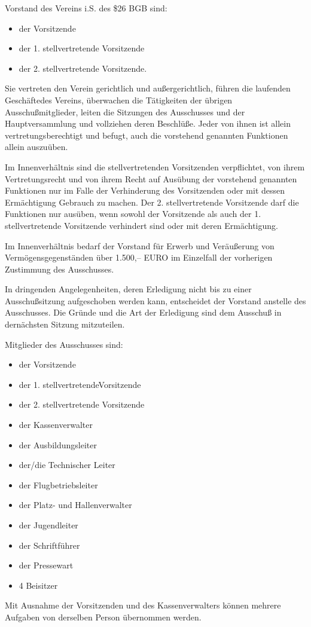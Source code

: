 \documentclass[11pt,a4paper,parskip=half]{scrartcl}
\begin{document}
\begin{contract}
\begin{multicols}{2}
    Vorstand des Vereins i.S. des \$26 BGB sind:
    \begin{itemize}
      \item der Vorsitzende
      \item der 1. stellvertretende Vorsitzende
      \item der 2. stellvertretende Vorsitzende.
    \end{itemize}
    Sie vertreten den Verein gerichtlich und außergerichtlich,
    führen die laufenden Geschäftedes Vereins,
    überwachen die Tätigkeiten der übrigen Ausschußmitglieder,
    leiten die Sitzungen des Ausschusses und der Hauptversammlung und vollziehen deren Beschlüße.
    Jeder von ihnen ist allein vertretungsberechtigt und befugt,
    auch die vorstehend genannten Funktionen allein auszuüben.

    Im Innenverhältnis sind die stellvertretenden Vorsitzenden verpflichtet,
    von ihrem Vertretungsrecht und von ihrem Recht auf Ausübung der vorstehend genannten Funktionen nur im Falle der Verhinderung des Vorsitzenden oder mit dessen Ermächtigung Gebrauch zu machen.
    Der 2. stellvertretende Vorsitzende darf die Funktionen nur ausüben,
    wenn sowohl der
    Vorsitzende als auch der 1. stellvertretende Vorsitzende verhindert sind oder mit deren  Ermächtigung.

    Im Innenverhältnis bedarf der Vorstand für Erwerb und Veräußerung von  Vermögensgegenständen über 1.500,-- EURO im Einzelfall der vorherigen Zustimmung des Ausschusses.

    In dringenden Angelegenheiten,
    deren Erledigung nicht bis zu einer Ausschußsitzung aufgeschoben werden kann,
    entscheidet der Vorstand anstelle des Ausschusses.
    Die Gründe und die Art der Erledigung sind dem Ausschuß in dernächsten Sitzung mitzuteilen.

    Mitglieder des Ausschusses sind:
    \begin{itemize}
      \item der Vorsitzende
      \item der 1. stellvertretendeVorsitzende
      \item der 2. stellvertretende Vorsitzende
      \item der Kassenverwalter
      \item der Ausbildungsleiter
      \item der/die Technischer Leiter
      \item der Flugbetriebsleiter
      \item der Platz- und Hallenverwalter
      \item der Jugendleiter
      \item der Schriftführer
      \item der Pressewart
      \item 4 Beisitzer
  \end{itemize}
    Mit Ausnahme der Vorsitzenden und des Kassenverwalters können mehrere Aufgaben von derselben Person übernommen werden.


\end{multicols}
\end{contract}
\end{document}

